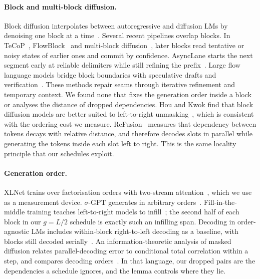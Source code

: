 \documentclass[11pt]{article}
\theoremstyle{definition}
\theoremstyle{remark}
\begin{document}
\paragraph{Block and multi-block diffusion.}
Block diffusion interpolates between autoregressive and diffusion LMs by denoising one block at a time~\citep{arriola2025block}.
Several recent pipelines overlap blocks.
In TeCoP~\citep{tsou2026tecop}, FlowBlock~\citep{tian2026flowblock} and multi-block diffusion~\citep{jin2026multibd}, later blocks read tentative or noisy states of earlier ones and commit by confidence.
AsyncLane starts the next segment early at reliable delimiters while still refining the prefix~\citep{ren2026asynclane}.
Large flow language models bridge block boundaries with speculative drafts and verification~\citep{chavan2026lafa}.
These methods repair seams through iterative refinement and temporary context.
We found none that fixes the generation order inside a block or analyses the distance of dropped dependencies.
Hou and Kwok find that block diffusion models are better suited to left-to-right unmasking~\citep{hou2026rethinking}, which is consistent with the ordering cost we measure.
ReFusion~\citep{li2025refusion} measures that dependency between tokens decays with relative distance, and therefore decodes slots in parallel while generating the tokens inside each slot left to right.
This is the same locality principle that our schedules exploit.

\paragraph{Generation order.}
XLNet trains over factorisation orders with two-stream attention~\citep{yang2019xlnet}, which we use as a measurement device.
$\sigma$-GPT generates in arbitrary orders~\citep{pannatier2024sigma}.
Fill-in-the-middle training teaches left-to-right models to infill~\citep{bavarian2022fim}; the second half of each block in our $g=L/2$ schedule is exactly such an infilling span.
Decoding in order-agnostic LMs includes within-block right-to-left decoding as a baseline, with blocks still decoded serially~\citep{yao2026orderagnostic}.
An information-theoretic analysis of masked diffusion relates parallel-decoding error to conditional total correlation within a step, and compares decoding orders~\citep{zhang2026generation}.
In that language, our dropped pairs are the dependencies a schedule ignores, and the lemma controls where they lie.
\end{document}
